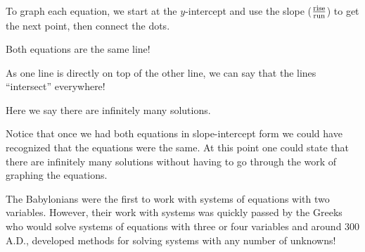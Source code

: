\begin{example}
\begin{multicols}{2}
    To graph each equation, we start at the $y$-intercept and use the slope
    ($\frac{\operatorname{rise}}{\operatorname{run}}$) to get the next point, then connect the
    dots.\pp
    
    Both equations are the same line! 
 	\end{multicols}
As one line is directly on top of the other line, we can say that the lines ``intersect'' everywhere!
		\begin{center}    
    Here we say there are infinitely many solutions.\\
		\end{center}
\end{example}
  
Notice that once we had both equations in slope-intercept form we could have recognized that
the equations were the same. At this point one could state that there are
infinitely many solutions without having to go through the work of graphing the
equations.\pp

{}The Babylonians were the first to work with
systems of equations with two variables. However, their work with systems was
quickly passed by the Greeks who would solve systems of equations with three
or four variables and around 300 A.D., developed methods for solving systems
with any number of unknowns!

%
